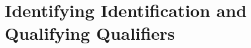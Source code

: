 \documentclass[runningheads]{llncs}
\begin{document}

\section{Identifying Identification and Qualifying Qualifiers}

\end{document}
